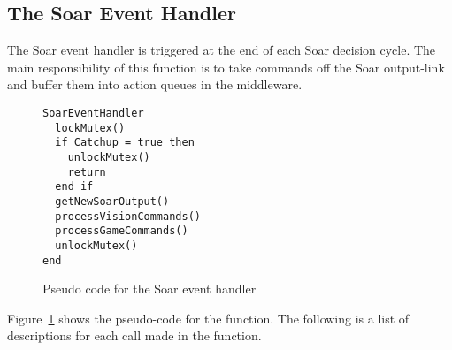 \subsection{The Soar Event Handler}
\label{sec:SoarEventHandler}

The Soar event handler is triggered at the end of each Soar decision
cycle. The main responsibility of this function is to take commands off
the Soar output-link and buffer them into action queues in the
middleware.

\begin{figure}
\begin{verbatim}
SoarEventHandler
  lockMutex()
  if Catchup = true then
    unlockMutex()
    return
  end if
  getNewSoarOutput()
  processVisionCommands()
  processGameCommands()
  unlockMutex()
end
\end{verbatim}
\caption{Pseudo code for the Soar event handler}
\label{fig:SoarEventHandler}
\end{figure}

Figure~\ref{fig:SoarEventHandler} shows the pseudo-code for the
function. The following is a list of descriptions for each call made in
the function.

